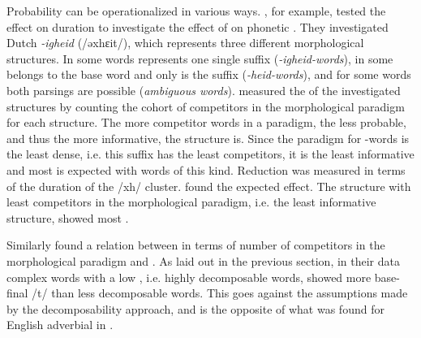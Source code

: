  
 Probability can be operationalized in various ways. 
   \cite{Pluymaekers.2010}, for example, tested the effect  on duration to investigate the effect of  on phonetic .
 They investigated Dutch \textit{\mbox{-igheid}} (/əxhɛit/), which represents three different morphological structures. In some words  represents one single suffix (\textit{\textit{-igheid}-words}), in some  belongs to the base word and only  is the suffix (\textit{-heid-words}), and for some words both parsings are possible (\textit{ambiguous words}). \cite{Pluymaekers.2010} measured the  of the investigated structures by counting the cohort of competitors in the morphological paradigm for each structure. 
 The more competitor words in a paradigm, the less probable, and thus the more informative, the structure is.  Since the paradigm for -words is the least dense, i.e. this suffix has the least competitors, it is the least informative and most  is expected with words of this kind. Reduction was measured in terms of the duration of the /xh/ cluster. \cite{Pluymaekers.2010} found the expected effect. The structure with least competitors in the morphological paradigm, i.e. the least informative structure, showed most .
  
  
 Similarly \cite{Schuppler.2012} found a relation between  in terms of number of competitors in the morphological paradigm and . 
 As laid out in the previous section, in their data complex words with a low , i.e. highly decomposable words, showed more base-final /t/  than less decomposable words. This goes against the assumptions made by the decomposability approach, and is the opposite of what was found for English adverbial  in \cite{Hay.2003}. 
 
